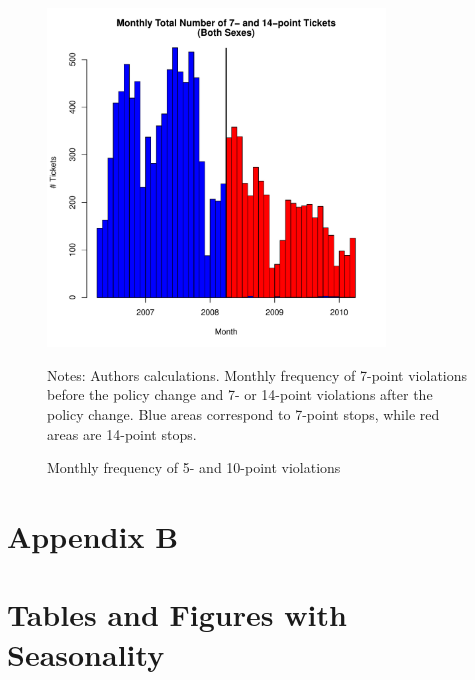 \begin{figure}
\centering
\includegraphics[width=0.8\textwidth]{../Figures/num_pts_7_14_all_orig.pdf}
\caption{Monthly frequency of 5- and 10-point violations }
Notes: Authors calculations. Monthly frequency of 7-point violations before the policy change and 7- or 14-point violations after the policy change. Blue areas correspond to 7-point stops, while red areas are 14-point stops.
\label{fig:num_pts_7_14_all}
\end{figure}

















\pagebreak

\section*{Appendix B}
\vspace{3.0in}

\section*{Tables and Figures with Seasonality}
\label{sec:Appendix}

\vfill
\eject





